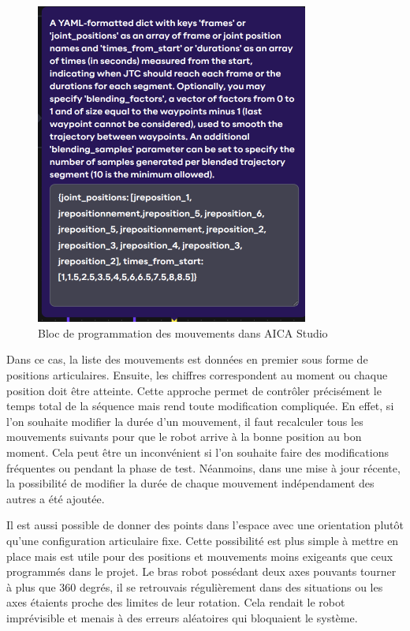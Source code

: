 \begin{figure}[H]
    \centering
    \includegraphics[width=0.8\textwidth]{assets/figures/AICA_payload.png}
    \caption{Bloc de programmation des mouvements dans AICA Studio}
    \label{fig:payload_block}
\end{figure}

Dans ce cas, la liste des mouvements est données en premier sous forme de positions articulaires. Ensuite, les chiffres correspondent au moment ou chaque position doit être atteinte. Cette approche permet de contrôler précisément le temps total de la séquence mais rend toute modification compliquée. En effet, si l'on souhaite modifier la durée d'un mouvement, il faut recalculer tous les mouvements suivants pour que le robot arrive à la bonne position au bon moment. Cela peut être un inconvénient si l'on souhaite faire des modifications fréquentes ou pendant la phase de test. Néanmoins, dans une mise à jour récente, la possibilité de modifier la durée de chaque mouvement indépendament des autres a été ajoutée.

Il est aussi possible de donner des points dans l'espace avec une orientation plutôt qu'une configuration articulaire fixe. Cette possibilité est plus simple à mettre en place mais est utile pour des positions et mouvements moins exigeants que ceux programmés dans le projet. Le bras robot possédant deux axes pouvants tourner à plus que 360 degrés, il se retrouvais régulièrement dans des situations ou les axes étaients proche des limites de leur rotation. Cela rendait le robot imprévisible et menais à des erreurs aléatoires qui bloquaient le système.
